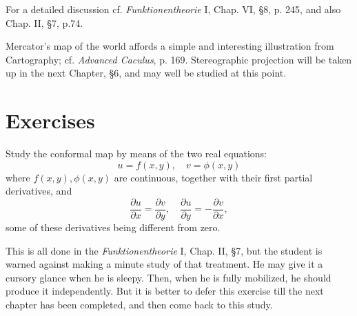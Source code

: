 \documentclass[twosided]{memoir}
\begin{document}
For a detailed discussion cf. \emph{Funktionentheorie} I, Chap. VI, \S 8, p. 245, and also Chap. II, \S 7, p.74.

Mercator's map of the world affords a simple and interesting illustration from Cartography; cf. \emph{Advanced Caculus}, p. 169. Stereographic projection will be taken up in the next Chapter, \S 6, and may well be studied at this point.

\section*{Exercises}
\problem Study the conformal map by means of the two real equations:
\[
	u=f(x,y), \quad v=\phi (x,y)
\] where $f(x,y), \phi (x,y)$ are continuous, together with their first partial derivatives, and
\[
\frac{\partial u}{\partial x} =\frac{\partial v}{\partial y} , \quad \frac{\partial u}{\partial y} =-\frac{\partial v}{\partial x} 
,\] some of these derivatives being different from zero. 

This is all done in the \emph{Funktionentheorie} I, Chap. II, \S 7, but the student is warned against making a minute study of that treatment. He may give it a cursory glance when he is sleepy. Then, when he is fully mobilized, he should produce it independently. But it is better to defer this exercise till the next chapter has been completed, and then come back to this study.
\end{document}
